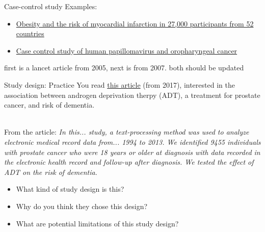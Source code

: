 \documentclass[10pt,t]{beamer}
\begin{document}
\begin{frame}[c]{Case-control study}
Examples:
\vspace{0.3cm}

\begin{itemize}
	\item \href{https://www.sciencedirect.com/science/article/pii/S0140673605676635}{\color{cyan}Obesity and the risk of myocardial infarction in 27,000 participants from 52 countries}
	\item \href{http://www.nejm.org/doi/full/10.1056/NEJMoa065497\#t=article}{\color{cyan}Case control study of human papillomavirus and oropharyngeal cancer}
\end{itemize}

\color{red} first is a lancet article from 2005, next is from 2007. both should be updated

\end{frame}

\begin{frame}{Study design: Practice}
You read \href{https://jamanetwork.com/journals/jamaoncology/fullarticle/2569059?resultClick=24}{\color{cyan} this article} (from 2017), interested in the association between androgen deprivation therpy (ADT), a treatment for prostate cancer, and risk of dementia. \\~\

From the article: \textit{In this... study, a text-processing method was used to analyze electronic medical record data from... 1994 to 2013. We identified 9455 individuals with prostate cancer who were 18 years or older at diagnosis with data recorded in the electronic health record and follow-up after diagnosis. We tested the effect of ADT on the risk of dementia.}

\vspace{0.3cm}

\begin{itemize}
	\item What kind of study design is this?
	\item Why do you think they chose this design? %
	\item What are potential limitations of this study design?
\end{itemize}
\end{frame}
\end{document}
